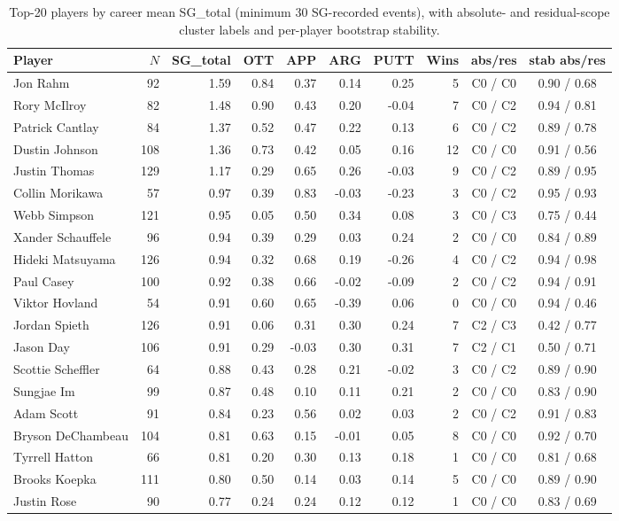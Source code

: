 \documentclass[11pt]{article}
\begin{document}
\begin{table}[t]
\centering
\small
\caption{Top-20 players by career mean SG\_total (minimum 30 SG-recorded events), with absolute- and residual-scope cluster labels and per-player bootstrap stability.}
\label{tab:top20}
\begin{tabular}{lrrrrrrrcc}
\toprule
Player & $N$ & SG\_total & OTT & APP & ARG & PUTT & Wins & abs/res & stab abs/res \\
\midrule
Jon Rahm          &  92 & 1.59 &  0.84 &  0.37 &  0.14 &  0.25 &  5 & C0 / C0 & 0.90 / 0.68 \\
Rory McIlroy      &  82 & 1.48 &  0.90 &  0.43 &  0.20 & -0.04 &  7 & C0 / C2 & 0.94 / 0.81 \\
Patrick Cantlay   &  84 & 1.37 &  0.52 &  0.47 &  0.22 &  0.13 &  6 & C0 / C2 & 0.89 / 0.78 \\
Dustin Johnson    & 108 & 1.36 &  0.73 &  0.42 &  0.05 &  0.16 & 12 & C0 / C0 & 0.91 / 0.56 \\
Justin Thomas     & 129 & 1.17 &  0.29 &  0.65 &  0.26 & -0.03 &  9 & C0 / C2 & 0.89 / 0.95 \\
Collin Morikawa   &  57 & 0.97 &  0.39 &  0.83 & -0.03 & -0.23 &  3 & C0 / C2 & 0.95 / 0.93 \\
Webb Simpson      & 121 & 0.95 &  0.05 &  0.50 &  0.34 &  0.08 &  3 & C0 / C3 & 0.75 / 0.44 \\
Xander Schauffele &  96 & 0.94 &  0.39 &  0.29 &  0.03 &  0.24 &  2 & C0 / C0 & 0.84 / 0.89 \\
Hideki Matsuyama  & 126 & 0.94 &  0.32 &  0.68 &  0.19 & -0.26 &  4 & C0 / C2 & 0.94 / 0.98 \\
Paul Casey        & 100 & 0.92 &  0.38 &  0.66 & -0.02 & -0.09 &  2 & C0 / C2 & 0.94 / 0.91 \\
Viktor Hovland    &  54 & 0.91 &  0.60 &  0.65 & -0.39 &  0.06 &  0 & C0 / C0 & 0.94 / 0.46 \\
Jordan Spieth     & 126 & 0.91 &  0.06 &  0.31 &  0.30 &  0.24 &  7 & C2 / C3 & 0.42 / 0.77 \\
Jason Day         & 106 & 0.91 &  0.29 & -0.03 &  0.30 &  0.31 &  7 & C2 / C1 & 0.50 / 0.71 \\
Scottie Scheffler &  64 & 0.88 &  0.43 &  0.28 &  0.21 & -0.02 &  3 & C0 / C2 & 0.89 / 0.90 \\
Sungjae Im        &  99 & 0.87 &  0.48 &  0.10 &  0.11 &  0.21 &  2 & C0 / C0 & 0.83 / 0.90 \\
Adam Scott        &  91 & 0.84 &  0.23 &  0.56 &  0.02 &  0.03 &  2 & C0 / C2 & 0.91 / 0.83 \\
Bryson DeChambeau & 104 & 0.81 &  0.63 &  0.15 & -0.01 &  0.05 &  8 & C0 / C0 & 0.92 / 0.70 \\
Tyrrell Hatton    &  66 & 0.81 &  0.20 &  0.30 &  0.13 &  0.18 &  1 & C0 / C0 & 0.81 / 0.68 \\
Brooks Koepka     & 111 & 0.80 &  0.50 &  0.14 &  0.03 &  0.14 &  5 & C0 / C0 & 0.89 / 0.90 \\
Justin Rose       &  90 & 0.77 &  0.24 &  0.24 &  0.12 &  0.12 &  1 & C0 / C0 & 0.83 / 0.69 \\
\bottomrule
\end{tabular}
\end{table}
\end{document}
